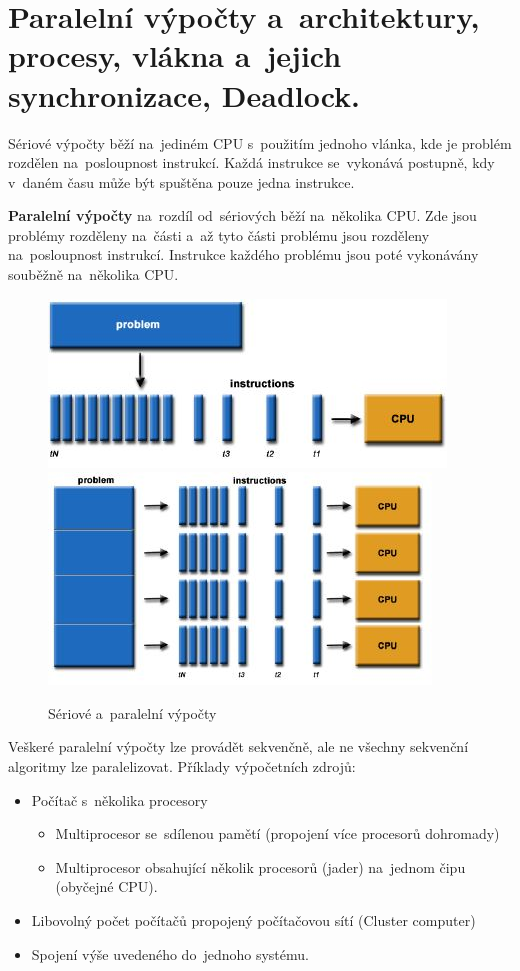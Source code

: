 \clearpage
\section{Paralelní výpočty a~architektury, procesy, vlákna a~jejich synchronizace, Deadlock.}

Sériové výpočty běží na~jediném CPU s~použitím jednoho vlánka, kde je problém rozdělen na~posloupnost instrukcí. Každá instrukce se~vykonává postupně, kdy v~daném času může být spuštěna pouze jedna instrukce.

\textbf{Paralelní výpočty} na~rozdíl od~sériových běží na~několika CPU. Zde jsou problémy rozděleny na~části a~až tyto části problému jsou rozděleny na~posloupnost instrukcí. Instrukce každého problému jsou poté vykonávány souběžně na~několika CPU.

\begin{figure}[ht]
	\centering
	\includegraphics[scale=0.7]{images/serialComputing.JPG}
	\hspace*{1em}
	\includegraphics[scale=0.7]{images/parallelComputing.JPG}
	
	\caption{Sériové a~paralelní výpočty}
\end{figure}

Veškeré paralelní výpočty lze provádět sekvenčně, ale ne všechny sekvenční algoritmy lze paralelizovat. Příklady výpočetních zdrojů:
\begin{itemize}
	\item Počítač s~několika procesory
	\begin{itemize}
		\item Multiprocesor se~sdílenou pamětí (propojení více procesorů dohromady)
		\item Multiprocesor obsahující několik procesorů (jader) na~jednom čipu (obyčejné CPU).
	\end{itemize}
	\item Libovolný počet počítačů propojený počítačovou sítí (Cluster computer)
	\item Spojení výše uvedeného do~jednoho systému.
\end{itemize}

